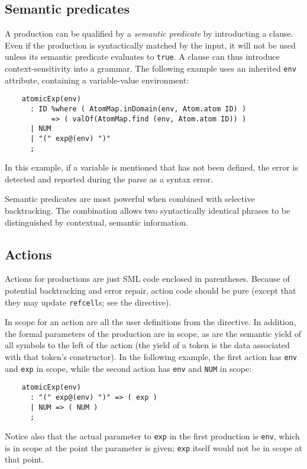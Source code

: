 \subsection{Semantic predicates}

A production can be qualified by a \emph{semantic predicate} by introducting a  clause.  Even if the production is syntactically matched by the input, it will not be used unless its semantic predicate evaluates to \texttt{true}.  A  clause can thus introduce context-sensitivity into a grammar.  The following example uses an inherited \texttt{env} attribute, containing a variable-value environment:
\begin{verbatim}
    atomicExp(env)
      : ID %where ( AtomMap.inDomain(env, Atom.atom ID) )
           => ( valOf(AtomMap.find (env, Atom.atom ID)) )
      | NUM
      | "(" exp@(env) ")"
      ;
\end{verbatim}
In this example, if a variable is mentioned that has not been defined, the error is detected and reported during the parse as a syntax error.

Semantic predicates are most powerful when combined with selective backtracking.  The combination allows two syntactically identical phrases to be distinguished by contextual, semantic information.

\subsection{Actions}\label{sec:antlr-actions}

Actions for productions are just SML code enclosed in parentheses.  Because of potential backtracking and error repair, action code should be pure (except that they may update \antlr{} \texttt{refcell}s; see the  directive).

In scope for an action are all the user definitions from the  directive.  In addition, the formal parameters of the production are in scope, as are the semantic yield of all symbols to the left of the action (the yield of a token is the data associated with that token's constructor).  In the following example, the first action has \texttt{env} and \texttt{exp} in scope, while the second action has \texttt{env} and \texttt{NUM} in scope:
\begin{verbatim}
    atomicExp(env)
      : "(" exp@(env) ")" => ( exp )
      | NUM => ( NUM )
      ;
\end{verbatim}
Notice also that the actual parameter to \texttt{exp} in the first production is \texttt{env}, which is in scope at the point the parameter is given; \texttt{exp} itself would not be in scope at that point.

